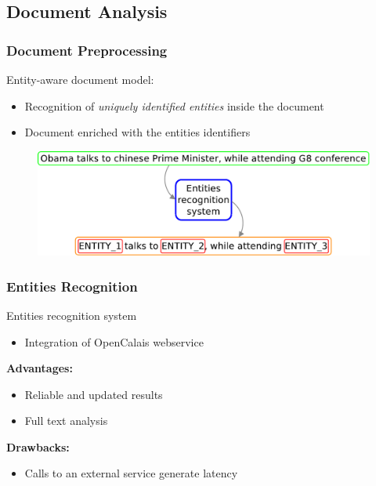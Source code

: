 \documentclass{beamer}
\begin{document}
\subsection{Document Analysis}

\begin{frame}
\frametitle{Document Preprocessing}
Entity-aware document model:\\
\begin{itemize}
\item Recognition of \emph{uniquely identified entities} inside the
  document
\item Document enriched with the entities identifiers
\end{itemize}
\medskip
\begin{figure}
\includegraphics[scale=0.43]{imgs/entrec}
\end{figure}
\end{frame}


\begin{frame}
\frametitle{Entities Recognition}
Entities recognition system
\begin{itemize}
\item Integration of OpenCalais webservice
\end{itemize}
\bigskip
{\color{red}\bfseries{Advantages:}}\\
\begin{itemize}
\item Reliable and updated results
\item Full text analysis
\end{itemize}
\medskip
{\color{red}\bfseries{Drawbacks:}}\\
\begin{itemize}
\item Calls to an external service generate latency
\end{itemize}
\end{frame}
\end{document}
